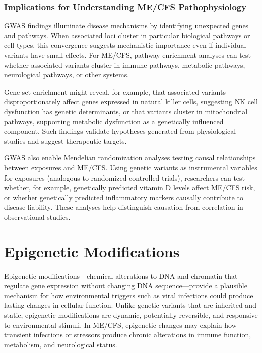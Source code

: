 \subsubsection{Implications for Understanding ME/CFS Pathophysiology}

GWAS findings illuminate disease mechanisms by identifying unexpected genes and pathways. When associated loci cluster in particular biological pathways or cell types, this convergence suggests mechanistic importance even if individual variants have small effects. For ME/CFS, pathway enrichment analyses can test whether associated variants cluster in immune pathways, metabolic pathways, neurological pathways, or other systems.

Gene-set enrichment might reveal, for example, that associated variants disproportionately affect genes expressed in natural killer cells, suggesting NK cell dysfunction has genetic determinants, or that variants cluster in mitochondrial pathways, supporting metabolic dysfunction as a genetically influenced component. Such findings validate hypotheses generated from physiological studies and suggest therapeutic targets.

GWAS also enable Mendelian randomization analyses testing causal relationships between exposures and ME/CFS. Using genetic variants as instrumental variables for exposures (analogous to randomized controlled trials), researchers can test whether, for example, genetically predicted vitamin D levels affect ME/CFS risk, or whether genetically predicted inflammatory markers causally contribute to disease liability. These analyses help distinguish causation from correlation in observational studies.

\section{Epigenetic Modifications}
\label{sec:epigenetics}

Epigenetic modifications---chemical alterations to DNA and chromatin that regulate gene expression without changing DNA sequence---provide a plausible mechanism for how environmental triggers such as viral infections could produce lasting changes in cellular function. Unlike genetic variants that are inherited and static, epigenetic modifications are dynamic, potentially reversible, and responsive to environmental stimuli. In ME/CFS, epigenetic changes may explain how transient infections or stressors produce chronic alterations in immune function, metabolism, and neurological status.


